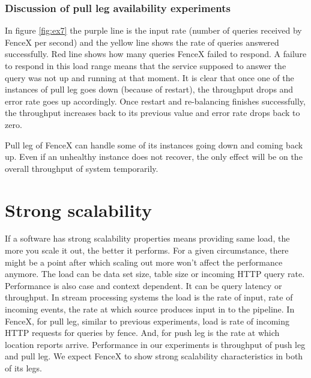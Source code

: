 \documentclass[a4]{report}
\begin{document}
    \clearpage

    \subsubsection{Discussion of pull leg availability experiments}
    In figure \ref{fig:ex7} the purple line is the input rate (number of queries received by FenceX per second) and
    the yellow line shows the rate of queries answered successfully.
    Red line shows how many queries FenceX failed to respond.
    A failure to respond in this load range means that the service supposed to answer the query was not
    up and running at that moment.
    It is clear that once one of the instances of pull leg goes down (because of restart), the throughput drops and
    error rate goes up accordingly.
    Once restart and re-balancing finishes successfully, the throughput increases back to its previous value and
    error rate drops back to zero.

    Pull leg of FenceX can handle some of its instances going down and coming back up.
    Even if an unhealthy instance does not recover, the only effect will be on the overall throughput of system
    temporarily.


    \section{Strong scalability}
    If a software has strong scalability properties means providing same load, the more you scale it out, the better
    it performs.
    For a given circumstance, there might be a point after which scaling out more won't affect the performance anymore.
    The load can be data set size, table size or incoming HTTP query rate.
    Performance is also case and context dependent.
    It can be query latency or throughput.
    In stream processing systems the load is the rate of input, rate of incoming events, the rate at which source
    produces input in to the pipeline.
    In FenceX, for pull leg, similar to previous experiments, load is rate of incoming HTTP requests for queries by fence.
    And, for push leg is the rate at which location reports arrive.
    Performance in our experiments is throughput of push leg and pull leg.
    We expect FenceX to show strong scalability characteristics in both of its legs.
\end{document}
